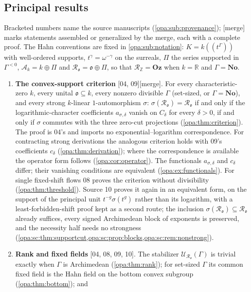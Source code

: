 \documentclass[11pt,oneside]{article}
\numberwithin{equation}{section}
\theoremstyle{definition}
\theoremstyle{remark}
\newcommand{\No}{\mathbf{No}}
\newcommand{\Oz}{\mathbf{Oz}}
\newcommand{\R}{\mathbb R}
\newcommand{\Z}{\mathbb Z}
\newcommand{\oo}{\mathfrak o}
\newcommand{\Ak}{\mathcal A_k}
\newcommand{\Ro}{\mathcal R_{\oo}}
\newcommand{\UU}{\mathcal U}
\newcommand{\Hahn}[2]{#1((t^{#2}))}
\newcommand{\src}[1]{\textup{\textsf{\small[#1]}}}
\newcommand{\mergetag}{\textup{\textsf{\small[merge]}}}
\begin{document}
\subsection{Principal results}\label{opa:sub:results}

Bracketed numbers name the source manuscripts (\cref{opa:sub:provenance});
\mergetag{} marks statements assembled or generalized by the merge, each with
a complete proof. The Hahn conventions are fixed in
\cref{opa:sub:notation}: $K=\Hahn k\Gamma$ with well-ordered supports,
$t^\gamma=\omega^{-\gamma}$ on the surreals, $\Pi$ the series supported in
$\Gamma^{<0}$, $\Ak=k\oplus\Pi$ and $\Ro=\oo\oplus\Pi$, so that
$\mathcal R_\Z=\Oz$ when $k=\R$ and $\Gamma=\No$.
\begin{enumerate}[label=\textup{(\arabic*)},leftmargin=*,itemsep=3pt]
\item \textbf{The convex-support criterion} \src{04, 09}\mergetag. For
every characteristic-zero $k$, every unital $\oo\subseteq k$, every nonzero
divisible $\Gamma$ (set-sized, or $\Gamma=\No$), and every strong
$k$-linear $1$-automorphism $\sigma$: $\sigma(\Ro)=\Ro$ if and only if the
logarithmic-character coefficients $a_{\sigma,\delta}$ vanish on $C_\delta$
for every $\delta>0$, if and only if $\sigma$ commutes with the three
zero-cut projections (\cref{opa:thm:criterion}). The proof is 04's and
imports no exponential--logarithm correspondence. For contracting strong
derivations the analogous criterion holds with 09's coefficients $c_\delta$
(\cref{opa:thm:derivation}); where the correspondence is available the
operator form follows (\cref{opa:cor:operator}). The functionals
$a_{\sigma,\delta}$ and $c_\delta$ differ; their vanishing conditions are
equivalent (\cref{opa:ex:functionals}). For single fixed-shift flows 08
proves the criterion without divisibility (\cref{opa:thm:threshold}).
Source 10 proves it again in an equivalent form, on the support of the
principal unit $t^{-g}\sigma(t^g)$ rather than its logarithm, with a
least-forbidden-shift proof kept as a second route; the inclusion
$\sigma(\Ro)\subseteq\Ro$ already suffices, every signed Archimedean block of
exponents is preserved, and the necessity half needs no strongness
(\cref{opa:sc:thm:supportcut,opa:sc:prop:blocks,opa:sc:rem:nonstrong}).
\item \textbf{Rank and fixed fields} \src{04, 08, 09, 10}. The stabilizer
$\UU_{\Ro}(\Gamma)$ is trivial exactly when $\Gamma$ is Archimedean
(\cref{opa:thm:rank}); for set-sized $\Gamma$ its common fixed field is the
Hahn field on the bottom convex subgroup (\cref{opa:thm:bottom}); and

\end{enumerate}
\end{document}
